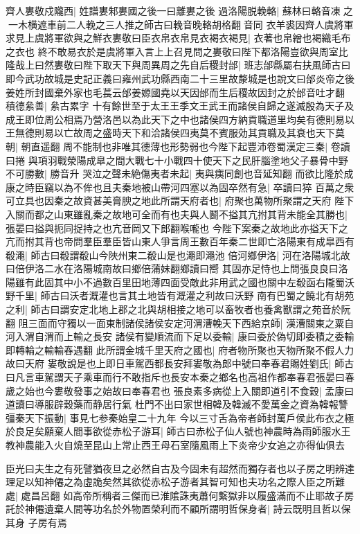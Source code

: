 齊人婁敬戍隴西|{
	姓譜婁邾婁國之後一曰離婁之後}
過洛陽脱輓輅|{
	蘇林曰輅音凍之一木横遮車前二人輓之三人推之師古曰輓音晚輅胡格翻音同}
衣羊裘因齊人虞將軍求見上虞將軍欲與之鮮衣婁敬曰臣衣帛衣帛見衣褐衣褐見|{
	衣著也帛繒也褐織毛布之衣也}
終不敢易衣於是虞將軍入言上上召見問之婁敬曰陛下都洛陽豈欲與周室比隆哉上曰然婁敬曰陛下取天下與周異周之先自后稷封邰|{
	班志邰縣屬右扶風師古曰即今武功故城是史記正義曰雍州武功縣西南二十三里故漦城是也說文曰邰炎帝之後姜姓所封國棄外家也毛萇云邰姜嫄國堯以天因邰而生后稷故因封之於邰音吐才翻}
積德絫善|{
	絫古累字}
十有餘世至于太王王季文王武王而諸侯自歸之遂滅殷為天子及成王即位周公相焉乃營洛邑以為此天下之中也諸侯四方納貢職道里均矣有德則易以王無德則易以亡故周之盛時天下和洽諸侯四夷莫不賓服効其貢職及其衰也天下莫朝|{
	朝直遥翻}
周不能制也非唯其德薄也形勢弱也今陛下起豐沛卷蜀漢定三秦|{
	卷讀曰捲}
與項羽戰滎陽成臯之間大戰七十小戰四十使天下之民肝腦塗地父子暴骨中野不可勝數|{
	勝音升}
哭泣之聲未絶傷夷者未起|{
	夷與痍同創也音延知翻}
而欲比隆於成康之時臣竊以為不侔也且夫秦地被山帶河四塞以為固卒然有急|{
	卒讀曰猝}
百萬之衆可立具也因秦之故資甚美膏腴之地此所謂天府者也|{
	府聚也萬物所聚謂之天府}
陛下入關而都之山東雖亂秦之故地可全而有也夫與人鬭不搤其亢拊其背未能全其勝也|{
	張晏曰搤與扼同捉持之也亢音岡又下郎翻喉嚨也}
今陛下案秦之故地此亦搤天下之亢而拊其背也帝問羣臣羣臣皆山東人爭言周王數百年秦二世即亡洛陽東有成皐西有殽澠|{
	師古曰殽謂殽山今陜州東二殽山是也澠即澠池}
倍河鄉伊洛|{
	河在洛陽城北故曰倍伊洛二水在洛陽城南故曰鄉倍蒲妹翻鄉讀曰嚮}
其固亦足恃也上問張良良曰洛陽雖有此固其中小不過數百里田地薄四面受敵此非用武之國也關中左殽函右隴蜀沃野千里|{
	師古曰沃者溉灌也言其土地皆有溉灌之利故曰沃野}
南有巴蜀之饒北有胡苑之利|{
	師古曰謂安定北地上郡之北與胡相接之地可以畜牧者也養禽獸謂之苑音於阮翻}
阻三面而守獨以一面東制諸侯諸侯安定河渭漕輓天下西給京師|{
	漢漕關東之粟自河入渭自渭而上輸之長安}
諸侯有變順流而下足以委輸|{
	康曰委於偽切即委積之委輸即轉輪之輸輸舂遇翻}
此所謂金城千里天府之國也|{
	府者物所聚也天物所聚不假人力故曰天府}
婁敬說是也上即日車駕西都長安拜婁敬為郎中號曰奉春君賜姓劉氏|{
	師古曰凡言車駕謂天子乘車而行不敢指斥也長安本秦之鄉名也高祖作都奉春君張晏曰春歲之始也今婁敬發事之始故曰奉春君也}
張良素多病從上入關即道引不食穀|{
	孟康曰道讀曰導服辟穀藥而静居行氣}
杜門不出曰家世相韓及韓滅不愛萬金之資為韓報讐彊秦天下振動|{
	事見七参秦始皇二十九年}
今以三寸舌為帝者師封萬戶侯此布衣之極於良足矣願棄人間事欲從赤松子游耳|{
	師古曰赤松子仙人號也神農時為雨師服水王教神農能入火自燒至昆山上常止西王母石室隨風雨上下炎帝少女追之亦得仙俱去}


臣光曰夫生之有死譬猶夜旦之必然自古及今固未有超然而獨存者也以子房之明辨達理足以知神僊之為虛詭矣然其欲從赤松子游者其智可知也夫功名之際人臣之所難處|{
	處昌呂翻}
如高帝所稱者三傑而已淮隂誅夷蕭何繫獄非以履盛滿而不止耶故子房託於神僊遺棄人間等功名於外物置榮利而不顧所謂明哲保身者|{
	詩云既明且哲以保其身}
子房有焉

